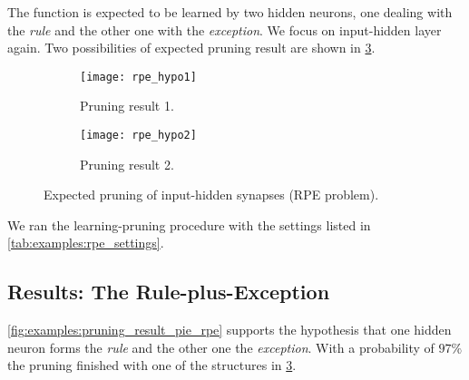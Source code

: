 The function is expected to be learned by two hidden neurons, one dealing with the \textit{rule} and the other one with the \textit{exception}. We focus on input-hidden layer again. Two possibilities of expected pruning result are shown in \cref{fig:examples:rpe_hypos}.

\begin{figure}[H]
\centering
\begin{subfigure}{.4\textwidth}
  \centering
  \texttt{[image: rpe\_hypo1]}
  \caption{Pruning result 1.}
  \label{fig:examples:rpe_hypo1}
\end{subfigure}
\begin{subfigure}{.4\textwidth}
  \centering
  \texttt{[image: rpe\_hypo2]}
  \caption{Pruning result 2.}
  \label{fig:examples:rpe_hypo2}
\end{subfigure}
\caption{Expected pruning of input-hidden synapses (RPE problem).}
\label{fig:examples:rpe_hypos}
\end{figure}

We ran the learning-pruning procedure with the settings listed in \cref{tab:examples:rpe_settings}.

\begin{table}[H]
\centering
{}
\caption{Experiment settings for dataset with unbalanced feature information.}
\label{tab:examples:rpe_settings}
\end{table}

\subsection*{Results: The Rule-plus-Exception}
\cref{fig:examples:pruning_result_pie_rpe} supports the hypothesis that one hidden neuron forms the \textit{rule} and the other one the \textit{exception}. With a probability of $ 97\% $ the pruning finished with one of the structures in \cref{fig:examples:rpe_hypos}.

